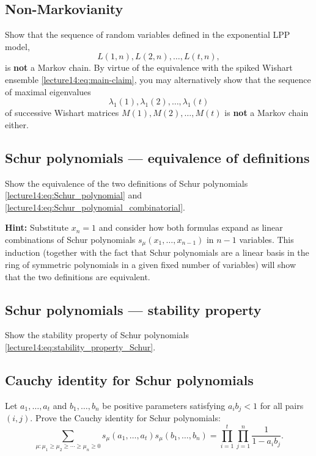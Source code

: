 \documentclass[letterpaper,11pt,oneside,reqno]{book}
\numberwithin{equation}{chapter}  %
\theoremstyle{definition}
\begin{document}
\subsection{Non-Markovianity}

Show that the sequence of random variables defined in the exponential LPP model,
\[
L(1,n),L(2,n),\dots,L(t,n),
\]
is \textbf{not} a Markov chain.
By virtue of the equivalence with the spiked Wishart ensemble \eqref{lecture14:eq:main-claim},
you may alternatively show that the sequence
of maximal eigenvalues
\[
\lambda_1(1),\lambda_1(2),\dots,\lambda_1(t)
\]
of successive
Wishart matrices $M(1),M(2),\dots,M(t)$ is \textbf{not} a Markov chain either.


\subsection{Schur polynomials --- equivalence of definitions}
\label{lecture14:prob:Schur_polynomials_equivalence}

Show the equivalence of the two definitions of Schur polynomials \eqref{lecture14:eq:Schur_polynomial} and \eqref{lecture14:eq:Schur_polynomial_combinatorial}.

\medskip
\noindent
\textbf{Hint:}
Substitute $x_n=1$ and consider how both formulas
expand as linear combinations of Schur
polynomials
$s_\mu(x_1,\ldots,x_{n-1} )$
in $n-1$ variables.
This induction (together with the fact that
Schur polynomials are a linear basis in the ring
of symmetric polynomials in a given fixed number of variables)
will show that the two definitions are equivalent.

\subsection{Schur polynomials --- stability property}

Show the stability property of Schur polynomials \eqref{lecture14:eq:stability_property_Schur}.


\subsection{Cauchy identity for Schur polynomials}
\label{lecture14:prob:Cauchy_identity}

Let $a_1, \ldots, a_t$ and $b_1, \ldots, b_n$ be positive parameters satisfying $a_i b_j < 1$ for all pairs $(i,j)$. Prove the Cauchy identity for Schur polynomials:
\begin{equation*}
	\sum_{\mu: \mu_1 \geq \mu_2 \geq \cdots \geq \mu_n \geq 0} s_\mu(a_1,\ldots,a_t)s_\mu(b_1,\ldots,b_n) = \prod_{i=1}^t\prod_{j=1}^n \frac{1}{1-a_i b_j}.
\end{equation*}
\end{document}
